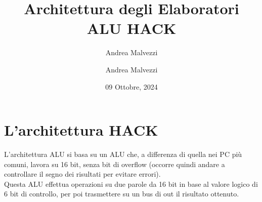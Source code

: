 \documentclass[12pt]{article}
\author{Andrea Malvezzi}
\title{\textbf{Architettura degli Elaboratori\\ALU HACK}}
\date{09 Ottobre, 2024}
\author{Andrea Malvezzi}
\begin{document}
\maketitle
\pagebreak
\tableofcontents
\pagebreak
\section{L'architettura HACK}
L'architettura ALU si basa su un ALU che, a differenza di quella nei PC più comuni, lavora su 16 bit, senza bit di overflow (occorre quindi andare a controllare il segno dei risultati per evitare errori).\\
Questa ALU effettua operazioni su due parole da 16 bit in base al valore logico di 6 bit di controllo, per poi trasmettere su un bus di out il risultato ottenuto.
\subsection{}
\end{document}
